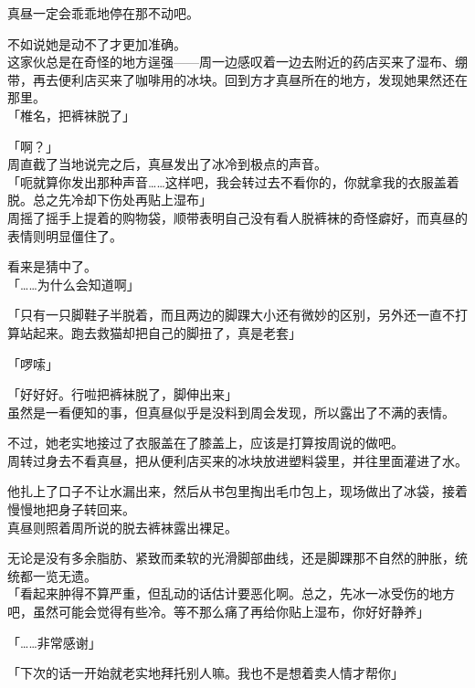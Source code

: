 真昼一定会乖乖地停在那不动吧。

不如说她是动不了才更加准确。\\

这家伙总是在奇怪的地方逞强——周一边感叹着一边去附近的药店买来了湿布、绷带，再去便利店买来了咖啡用的冰块。回到方才真昼所在的地方，发现她果然还在那里。\\

「椎名，把裤袜脱了」

「啊？」\\

周直截了当地说完之后，真昼发出了冰冷到极点的声音。\\

「呃就算你发出那种声音……这样吧，我会转过去不看你的，你就拿我的衣服盖着脱。总之先冷却下伤处再贴上湿布」\\

周摇了摇手上提着的购物袋，顺带表明自己没有看人脱裤袜的奇怪癖好，而真昼的表情则明显僵住了。

看来是猜中了。\\

「……为什么会知道啊」

「只有一只脚鞋子半脱着，而且两边的脚踝大小还有微妙的区别，另外还一直不打算站起来。跑去救猫却把自己的脚扭了，真是老套」

「啰嗦」

「好好好。行啦把裤袜脱了，脚伸出来」\\

虽然是一看便知的事，但真昼似乎是没料到周会发现，所以露出了不满的表情。

不过，她老实地接过了衣服盖在了膝盖上，应该是打算按周说的做吧。\\

周转过身去不看真昼，把从便利店买来的冰块放进塑料袋里，并往里面灌进了水。

他扎上了口子不让水漏出来，然后从书包里掏出毛巾包上，现场做出了冰袋，接着慢慢地把身子转回来。\\

真昼则照着周所说的脱去裤袜露出裸足。

无论是没有多余脂肪、紧致而柔软的光滑脚部曲线，还是脚踝那不自然的肿胀，统统都一览无遗。\\

「看起来肿得不算严重，但乱动的话估计要恶化啊。总之，先冰一冰受伤的地方吧，虽然可能会觉得有些冷。等不那么痛了再给你贴上湿布，你好好静养」

「……非常感谢」

「下次的话一开始就老实地拜托别人嘛。我也不是想着卖人情才帮你」\\

